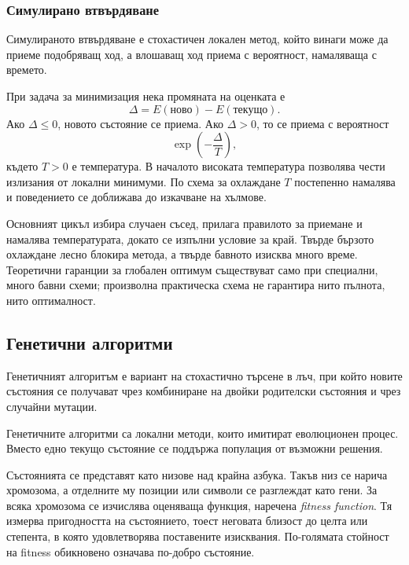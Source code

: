 \subsubsection{Симулирано втвърдяване}

\begin{defn}
Симулираното втвърдяване е стохастичен локален метод, който винаги може да приеме подобряващ ход, а влошаващ ход приема с вероятност, намаляваща с времето.
\end{defn}

При задача за минимизация нека промяната на оценката е
\[
\Delta=E(\text{ново})-E(\text{текущо}).
\]
Ако $\Delta\leq0$, новото състояние се приема. Ако $\Delta>0$, то се приема с вероятност
\[
\exp\left(-\frac{\Delta}{T}\right),
\]
където $T>0$ е температура. В началото високата температура позволява чести излизания от локални минимуми. По схема за охлаждане $T$ постепенно намалява и поведението се доближава до изкачване на хълмове.

Основният цикъл избира случаен съсед, прилага правилото за приемане и намалява температурата, докато се изпълни условие за край. Твърде бързото охлаждане лесно блокира метода, а твърде бавното изисква много време. Теоретични гаранции за глобален оптимум съществуват само при специални, много бавни схеми; произволна практическа схема не гарантира нито пълнота, нито оптималност.

\subsection{Генетични алгоритми}\label{s:25.1.4}

\begin{defn}
Генетичният алгоритъм е вариант на стохастично търсене в лъч, при който новите състояния се получават чрез комбиниране на двойки родителски състояния и чрез случайни мутации.
\end{defn}

Генетичните алгоритми са локални методи, които имитират еволюционен процес. Вместо едно текущо състояние се поддържа популация от възможни решения.

\begin{defn}
Състоянията се представят като низове над крайна азбука. Такъв низ се нарича хромозома, а отделните му позиции или символи се разглеждат като гени. За всяка хромозома се изчислява оценяваща функция, наречена \emph{fitness function}. Тя измерва пригодността на състоянието, тоест неговата близост до целта или степента, в която удовлетворява поставените изисквания. По-голямата стойност на fitness обикновено означава по-добро състояние.
\end{defn}

